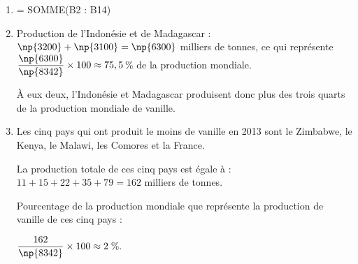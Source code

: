
\medskip

\begin{enumerate}
\item  = SOMME(B2 : B14)
\item Production de l'Indonésie et de Madagascar : $\np{3200} + \np{3100} = \np{6300}$ milliers de tonnes, ce qui représente $\dfrac{\np{6300}}{\np{8342}} \times 100 \approx  75,5$\,\% de la production mondiale.

À eux deux, l'Indonésie et Madagascar produisent donc plus des trois quarts de la production mondiale de vanille.
\item Les cinq pays qui ont produit le moins de vanille en 2013 sont le Zimbabwe, le Kenya, le Malawi, les Comores et la France.

La production totale de ces cinq pays est égale à  : $11 + 15 + 22 + 35 + 79 = 162$ milliers de tonnes.

Pourcentage de la production mondiale que représente la production de vanille de ces cinq pays : 

$\dfrac{162}{\np{8342}} \times 100 \approx  2$\,\%.
\end{enumerate}

\vspace{0,5cm}


